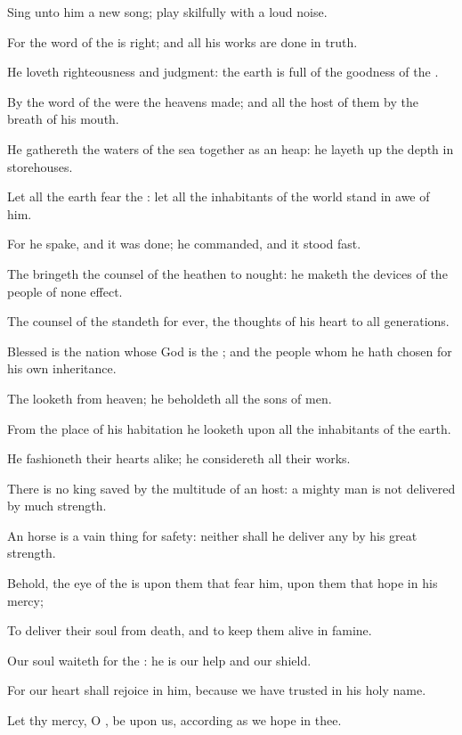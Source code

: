 \verse Sing unto him a new song; play skilfully with a loud noise.

\verse For the word of the \LORD is right; and all his works are done in truth.

\verse He loveth righteousness and judgment: the earth is full of the goodness of the \LORD.

\verse By the word of the \LORD were the heavens made; and all the host of them by the breath of his mouth.

\verse He gathereth the waters of the sea together as an heap: he layeth up the depth in storehouses.

\verse Let all the earth fear the \LORD: let all the inhabitants of the world stand in awe of him.

\verse For he spake, and it was done; he commanded, and it stood fast.

\verse The \LORD bringeth the counsel of the heathen to nought: he maketh the devices of the people of none effect.

\verse The counsel of the \LORD standeth for ever, the thoughts of his heart to all generations.

\verse Blessed is the nation whose God is the \LORD; and the people whom he hath chosen for his own inheritance.

\verse The \LORD looketh from heaven; he beholdeth all the sons of men.

\verse From the place of his habitation he looketh upon all the inhabitants of the earth.

\verse He fashioneth their hearts alike; he considereth all their works.

\verse There is no king saved by the multitude of an host: a mighty man is not delivered by much strength.

\verse An horse is a vain thing for safety: neither shall he deliver any by his great strength.

\verse Behold, the eye of the \LORD is upon them that fear him, upon them that hope in his mercy;

\verse To deliver their soul from death, and to keep them alive in famine.

\verse Our soul waiteth for the \LORD: he is our help and our shield.

\verse For our heart shall rejoice in him, because we have trusted in his holy name.

\verse Let thy mercy, O \LORD, be upon us, according as we hope in thee.




